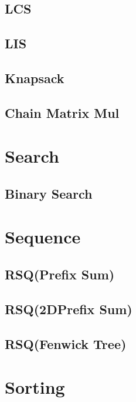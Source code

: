 \subsection{LCS}


\subsection{LIS}


\subsection{Knapsack}


\subsection{Chain Matrix Mul}

\section{Search}

\subsection{Binary Search}

\section{Sequence}

\subsection{RSQ(Prefix Sum)}


\subsection{RSQ(2DPrefix Sum)}


\subsection{RSQ(Fenwick Tree)}

\section{Sorting}


